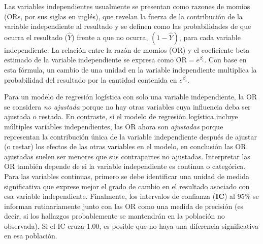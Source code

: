 \documentclass[12pt]{article}
\begin{document}
Las variables independientes usualmente se presentan como razones de momios (ORs, por sus siglas en ingl\'es), que revelan la fuerza de la contribuci\'on de la variable independiente al resultado y se definen como las probabilidades de que ocurra el resultado ($\hat{Y}$) frente a que no ocurra, $(1 - \hat{Y})$, para cada variable independiente. La relaci\'on entre la raz\'on de momios (OR) y el coeficiente beta estimado de la variable independiente se expresa como $\text{OR} = e^{\beta_i}$. Con base en esta f\'ormula, un cambio de una unidad en la variable independiente multiplica la probabilidad del resultado por la cantidad contenida en $e^{\beta_i}$.

Para un modelo de regresi\'on log\'istica con solo una variable independiente, la OR se considera \textit{no ajustada} porque no hay otras variables cuya influencia deba ser ajustada o restada. En contraste, si el modelo de regresi\'on log\'istica incluye m\'ultiples variables independientes, las OR ahora son \textit{ajustadas} porque representan la contribuci\'on \'unica de la variable independiente despu\'es de ajustar (o restar) los efectos de las otras variables en el modelo, en conclusi\'on las OR ajustadas suelen ser menores que sus contrapartes no ajustadas. Interpretar las OR tambi\'en depende de si la variable independiente es continua o categ\'orica. Para las variables continuas, primero se debe identificar una unidad de medida significativa que exprese mejor el grado de cambio en el resultado asociado con esa variable independiente. Finalmente, los intervalos de confianza (\textbf{IC}) al 95\% se informan rutinariamente junto con las OR como una medida de precisi\'on (es decir, si los hallazgos probablemente se mantendr\'an en la poblaci\'on no observada). Si el IC cruza 1.00, es posible que no haya una diferencia significativa en esa poblaci\'on. 
\end{document}
